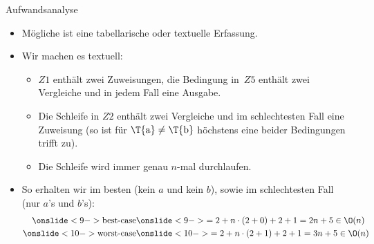 {\begin{frame}{Aufwandsanalyse}
\begin{itemize}
    \itemsep14pt
    \item<3-> Mögliche ist eine tabellarische oder textuelle Erfassung.
    \item<4-> Wir machen es textuell: \begin{itemize}
        \itemsep7pt
        \item<5-> \(Z1\) enthält zwei Zuweisungen, die Bedingung in~\(Z5\) enthält zwei\\Vergleiche und in jedem Fall eine Ausgabe. %
        \item<6-> Die Schleife in \(Z2\) enthält zwei Vergleiche und im schlechtesten Fall eine Zuweisung (so ist für \(\text{\T{a}} \neq \text{\T{b}}\) höchstens eine beider Bedingungen trifft zu).
        \item<7-> Die Schleife wird immer genau \(n\)-mal durchlaufen.
    \end{itemize}
    \item<8-> So erhalten wir im besten (kein \(a\) und kein \(b\)), sowie im schlechtesten Fall (nur \(a\)'s und \(b\)'s):\vspace*{-3.5mm} \begin{align*}
        \onslide<9->{\text{best-case}} &\onslide<9->{= 2 + n \cdot (2 + 0) + 2 + 1 = 2n + 5 \in \O(n)}\\
        \onslide<10->{\text{worst-case}} &\onslide<10->{= 2 + n \cdot (2 + 1) + 2 + 1 = 3n + 5 \in \O(n)}
    \end{align*}
\end{itemize}
\endtikzpicture
\end{frame}
}

